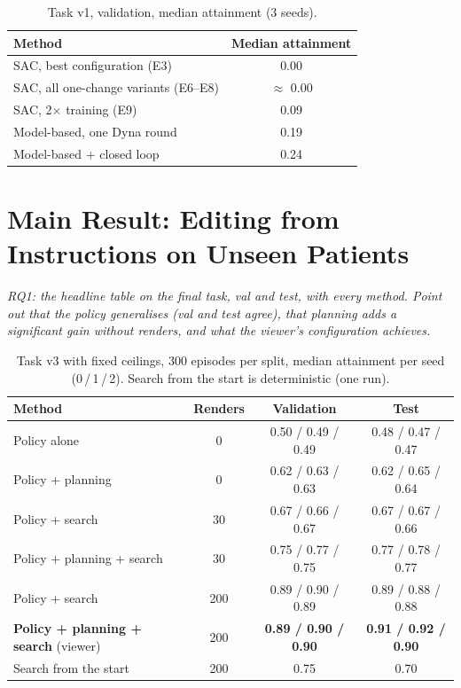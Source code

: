 \documentclass[12pt, a4paper]{book}
\newcommand{\plan}[1]{{\color{gray}\itshape #1\par}}
\begin{document}
\begin{table}[ht]
  \centering
  \caption[Model-free vs.\ model-based on task v1]{Task v1, validation, median attainment (3 seeds).}
  \label{tab:eval-modelfree}
  \begin{tabular}{lc}
    \toprule
    Method & Median attainment \\
    \midrule
    SAC, best configuration (E3) & 0.00 \\
    SAC, all one-change variants (E6--E8) & $\approx$ 0.00 \\
    SAC, 2$\times$ training (E9) & 0.09 \\
    Model-based, one Dyna round & 0.19 \\
    Model-based + closed loop & 0.24 \\
    \bottomrule
  \end{tabular}
\end{table}

\section{Main Result: Editing from Instructions on Unseen Patients}
\label{sec:eval-main}
\plan{RQ1: the headline table on the final task, val and test, with every method. Point out that the policy generalises (val and test agree), that planning adds a significant gain without renders, and what the viewer's configuration achieves.}

\begin{table}[ht]
  \centering
  \small
  \caption[Main results]{Task v3 with fixed ceilings, 300 episodes per split, median attainment per seed (0\,/\,1\,/\,2). Search from the start is deterministic (one run).}
  \label{tab:eval-main}
  \begin{tabular}{lccc}
    \toprule
    Method & Renders & Validation & Test \\
    \midrule
    Policy alone & 0 & 0.50 / 0.49 / 0.49 & 0.48 / 0.47 / 0.47 \\
    Policy + planning & 0 & 0.62 / 0.63 / 0.63 & 0.62 / 0.65 / 0.64 \\
    Policy + search & 30 & 0.67 / 0.66 / 0.67 & 0.67 / 0.67 / 0.66 \\
    Policy + planning + search & 30 & 0.75 / 0.77 / 0.75 & 0.77 / 0.78 / 0.77 \\
    Policy + search & 200 & 0.89 / 0.90 / 0.89 & 0.89 / 0.88 / 0.88 \\
    \textbf{Policy + planning + search} (viewer) & 200 & \textbf{0.89 / 0.90 / 0.90} & \textbf{0.91 / 0.92 / 0.90} \\
    Search from the start & 200 & 0.75 & 0.70 \\
    \bottomrule
  \end{tabular}
\end{table}
\end{document}
